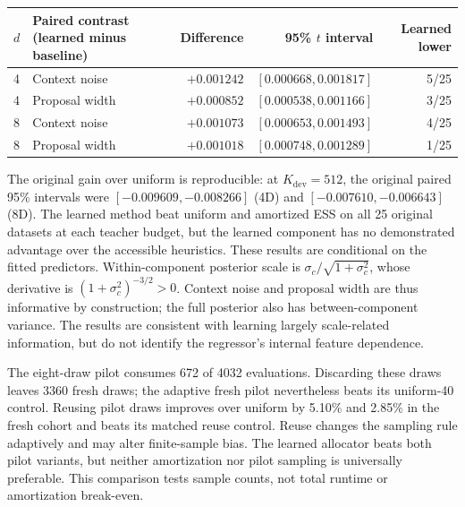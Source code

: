 \documentclass[10pt,letterpaper]{article}
\newcommand{\dev}{K_{\mathrm{dev}}}
\begin{document}
\begin{center}\begin{minipage}{\linewidth}\centering\small
\begin{tabular}{@{}llrrr@{}}
\toprule
$d$ & Paired contrast (learned minus baseline) & Difference & 95\% $t$ interval & Learned lower\\
\midrule
4 & Context noise & $+0.001242$ & $[0.000668,0.001817]$ &5/25\\
4 & Proposal width & $+0.000852$ & $[0.000538,0.001166]$ &3/25\\
8 & Context noise & $+0.001073$ & $[0.000653,0.001493]$ &4/25\\
8 & Proposal width & $+0.001018$ & $[0.000748,0.001289]$ &1/25\\
\bottomrule
\end{tabular}
\label{tab:cheap}
\end{minipage}\end{center}
The original gain over uniform is reproducible: at $\dev=512$, the original paired 95\% intervals were $[-0.009609,-0.008266]$ (4D) and $[-0.007610,-0.006643]$ (8D). The learned method beat uniform and amortized ESS on all 25 original datasets at each teacher budget, but the learned component has no demonstrated advantage over the accessible heuristics. These results are conditional on the fitted predictors. Within-component posterior scale is $\sigma_c/\sqrt{1+\sigma_c^2}$, whose derivative is $(1+\sigma_c^2)^{-3/2}>0$. Context noise and proposal width are thus informative by construction; the full posterior also has between-component variance. The results are consistent with learning largely scale-related information, but do not identify the regressor's internal feature dependence.

The eight-draw pilot consumes 672 of 4032 evaluations. Discarding these draws leaves 3360 fresh draws; the adaptive fresh pilot nevertheless beats its uniform-40 control. Reusing pilot draws improves over uniform by 5.10\% and 2.85\% in the fresh cohort and beats its matched reuse control. Reuse changes the sampling rule adaptively and may alter finite-sample bias. The learned allocator beats both pilot variants, but neither amortization nor pilot sampling is universally preferable. This comparison tests sample counts, not total runtime or amortization break-even.
\end{document}
